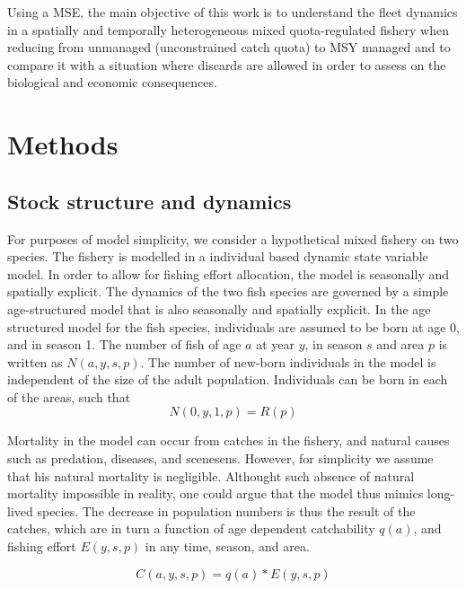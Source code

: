 \documentclass[12pt,oneline,a4paper,numbib]{ouparticle}
\begin{document}
Using a MSE, the main objective of this work is to understand the fleet dynamics in a spatially and temporally heterogeneous mixed quota-regulated fishery when reducing from unmanaged (unconstrained catch quota) to MSY managed and to compare it with a situation where discards are allowed in order to assess on the biological and economic consequences. 



\section{Methods}
\label{sec2}

\subsection{Stock structure and dynamics}
\label{sec2.1}

For purposes of model simplicity, we consider a hypothetical mixed fishery on two species. The fishery is modelled in a individual based dynamic state variable model. In order to allow for fishing effort allocation, the model is seasonally and spatially explicit. The dynamics of the two fish species are governed by a simple age-structured model that is also seasonally and spatially explicit. In the age structured model for the fish species, individuals are assumed to be born at age 0, and in season 1. The number of fish of age $a$ at year $y$, in season $s$ and area $p$ is written as $N (a, y, s, p)$. The number of new-born individuals in the model is independent of the size of the adult population. Individuals can be born in each of the areas, such that  
\begin{equation*}
N (0, y, 1, p) = R (p)
\end{equation*}

Mortality in the model can occur from catches in the fishery, and natural causes such as predation, diseases, and scenesens. However, for simplicity we assume that his natural mortality is negligible. Althought such absence of natural mortality impossible in reality, one could argue that the model thus mimics long-lived species. The decrease in population numbers is thus the result of the catches, which are in turn a function of age dependent catchability $q(a)$, and fishing effort $E (y,s,p)$ in any time, season, and area. 

\begin{equation*}
C (a, y, s, p) = q(a) * E(y,s,p)
\end{equation*}
\end{document}
